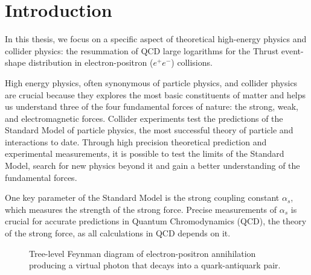 \documentclass[../Tesi_Jiahao_Miao_986136.tex]{subfiles}
\begin{document}
\chapter{Introduction}\label{ch:introduction}
\setcounter{page}{1}

In this thesis, we focus on a specific aspect of theoretical high-energy physics and collider physics: the resummation of QCD large logarithms for 
the Thrust event-shape distribution in electron-positron ($e^+e^-$) collisions.

High energy physics, often synonymous of particle physics, and collider physics are crucial because 
they explores the most basic constituents of matter and helps us understand three of the four fundamental forces of nature: 
the strong, weak, and electromagnetic forces. Collider experiments test the predictions of the Standard Model of particle physics,
the most successful theory of particle and interactions to date. Through high precision theoretical prediction and experimental measurements,
it is possible to test the limits of the Standard Model, search for new physics beyond it and gain a better understanding of the fundamental forces. 

One key parameter of the Standard Model is the strong coupling constant $\alpha_s$, which measures the strength of the strong force.
Precise measurements of $\alpha_s$ is crucial for accurate predictions in Quantum Chromodynamics (QCD), the theory of the strong force, as all calculations in QCD
depends on it.

\begin{figure}[h!]
    \centering
    \caption{Tree-level Feynman diagram of electron-positron annihilation producing a virtual photon that decays into a quark-antiquark pair.}
    \label{fig:ep_annihilation}
\end{figure}
\end{document}
